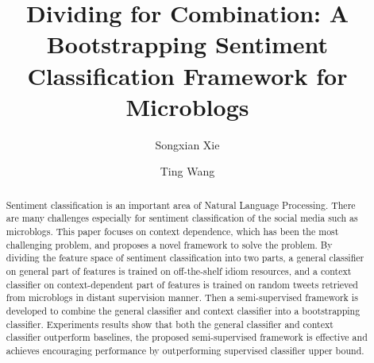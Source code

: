 \documentclass{llncs}
\begin{document}
\mainmatter  %

\title{Dividing for Combination: A Bootstrapping Sentiment Classification  Framework for Microblogs}
%
\author{Songxian Xie%
\and Ting Wang}
%

\maketitle

\begin{abstract}
Sentiment classification is an important area of Natural Language Processing.
There are many challenges especially for sentiment classification of the social media such as microblogs. 
This paper focuses on context dependence, which has been the most challenging problem, and proposes a novel framework to solve the problem.
By dividing the feature space of sentiment classification into two parts, a general classifier on general part of features is trained on off-the-shelf idiom resources, and a context classifier on context-dependent part of features is trained on random tweets retrieved from microblogs in distant supervision manner. 
Then a semi-supervised framework is developed to combine the general classifier and context classifier into a bootstrapping classifier. 
Experiments results show that both the general classifier and context classifier outperform baselines, the proposed semi-supervised framework is effective and achieves encouraging performance by outperforming supervised classifier upper bound. 
\end{abstract}
\end{document}
